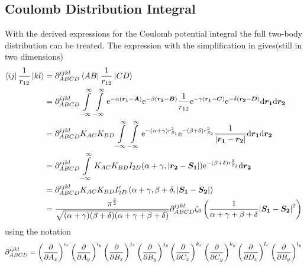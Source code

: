 \subsection{Coulomb Distribution Integral}
    With the derived expressions for the Coulomb potential integral the full
    two-body distribution can be treated. The expression with the
    simplification in  gives(still in two dimensions)
        \begin{align}
            \bra{ij}\frac{1}{r_{12}}\ket{kl} &= \mathrm{\partial}^{ijkl}_{ABCD}
            \bra{AB}\frac{1}{r_{12}}\ket{CD} \nonumber \\
            &= \mathrm{\partial}^{ijkl}_{ABCD} \int\limits^{\infty}_{-\infty}\int\limits^{\infty}_{-\infty}
            \mathrm{e}^{-\alpha(\boldsymbol{{r_1}}-\boldsymbol{{A}})}
            \mathrm{e}^{-\beta(\boldsymbol{{r_2}}-\boldsymbol{{B}})} \frac{1}{r_{12}}
            \mathrm{e}^{-\gamma(\boldsymbol{{r_1}}-\boldsymbol{{C}})}
            \mathrm{e}^{-\delta(\boldsymbol{{r_2}}-\boldsymbol{{D}})} \mathrm{d}\boldsymbol{{r_1}}\mathrm{d}\boldsymbol{{r_2}}
            \nonumber \\
            &= \mathrm{\partial}^{ijkl}_{ABCD} K_{AC}K_{BD}\int\limits^{\infty}_{-\infty}\int\limits^{\infty}_{-\infty}
            \mathrm{e}^{-(\alpha+\gamma)r^2_{S_1}}\mathrm{e}^{-(\beta+\delta)r^2_{S_2}}
            \frac{1}{\abs{\boldsymbol{{r_1}}-\boldsymbol{{r_2}}}}\mathrm{d}\boldsymbol{{r_1}}\mathrm{d}\boldsymbol{{r_2}}
            \nonumber \\
            &= \mathrm{\partial}^{ijkl}_{ABCD} \int\limits^{\infty}_{-\infty} K_{AC}K_{BD}
            I_{2D}(\alpha+\gamma,\abs{\boldsymbol{{r_2}}- \boldsymbol{{S_1}}}) \mathrm{e}^{-(\beta +
            \delta)r^2_{S_2}} \mathrm{d}\boldsymbol{{r_2}} \nonumber \\
            &= \mathrm{\partial}^{ijkl}_{ABCD} K_{AC}K_{BD}
            I'_{2D}\left(\alpha+\gamma,\beta+\delta,\abs{\boldsymbol{{S_1}}-\boldsymbol{{S_2}}}\right)
            \nonumber \\
            &= \frac{\pi^{\frac{3}{2}}}{\sqrt{(\alpha + \gamma)(\beta +
            \delta)(\alpha+\gamma+\beta+\delta)}} \mathrm{\partial}^{ijkl}_{ABCD}
            \zeta_0\left(\frac{1}{\alpha+\gamma+\beta+\delta}\abs{\boldsymbol{{S_1}} -
            \boldsymbol{{S_2}}}^2\right)
        \end{align}
    using the notation
        \begin{equation}
                 \mathrm{\partial}^{ijkl}_{ABCD} = \left(\frac{\mathrm{\partial}}{\mathrm{\partial} A_x}\right)^{i_x}\left(\frac{\mathrm{\partial}}{\mathrm{\partial} A_y}\right)^{i_y}
                 \left(\frac{\mathrm{\partial}}{\mathrm{\partial} B_x}\right)^{j_x}\left(\frac{\mathrm{\partial}}{\mathrm{\partial} B_y}\right)^{j_y} \left(\frac{\mathrm{\partial}}{\mathrm{\partial} C_x}\right)^{k_x}\left(\frac{\mathrm{\partial}}{\mathrm{\partial} C_y}\right)^{k_y}
                 \left(\frac{\mathrm{\partial}}{\mathrm{\partial} D_x}\right)^{l_x}\left(\frac{\mathrm{\partial}}{\mathrm{\partial} B_y}\right)^{l_y}
        \end{equation}
